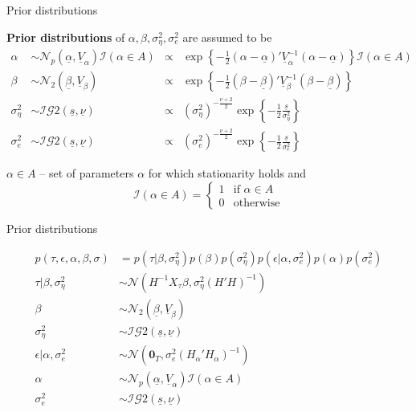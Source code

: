 \documentclass[notes,blackandwhite,mathsans,usenames,dvipsnames]{beamer}
\begin{document}
\begin{frame}{Prior distributions}

\bigskip
\textbf{Prior distributions} of $\alpha, \beta, \sigma^2_\eta, \sigma^2_e$ are assumed to be
\begin{align*}
\alpha&\sim\mathcal{N}_p\left(\underline{\alpha},\underline{V}_{\alpha}\right)\mathcal{I}(\alpha\in A)&\propto& \exp\left\{ -\frac{1}{2}(\alpha-\underline{\alpha})'\underline{V}_\alpha^{-1}(\alpha-\underline{\alpha}) \right\}\mathcal{I}(\alpha\in A) \\[2ex]
\beta&\sim\mathcal{N}_2\left(\underline{\beta},\underline{V}_{\beta}\right)&\propto& \exp\left\{ -\frac{1}{2}(\beta-\underline{\beta})'\underline{V}_\beta^{-1}(\beta-\underline{\beta}) \right\}\\[2ex]
\sigma^2_\eta&\sim\mathcal{IG}2\left(\underline{s},\underline{\nu}\right)&\propto&\left(\sigma^2_\eta\right)^{-\frac{\underline{\nu}+2}{2}} \exp\left\{ -\frac{1}{2}\frac{\underline{s}}{\sigma^2_\eta} \right\}\\[2ex]
\sigma^2_e&\sim\mathcal{IG}2\left(\underline{s},\underline{\nu}\right) &\propto&\left(\sigma^2_e\right)^{-\frac{\underline{\nu}+2}{2}} \exp\left\{ -\frac{1}{2}\frac{\underline{s}}{\sigma^2_e} \right\}
\end{align*}

$\alpha\in A$ {\color{mcxs2} -- set of parameters } $\alpha$ {\color{mcxs2} for which stationarity holds and} 
$$ \mathcal{I}(\alpha\in A)=\left\{ \begin{array}{ll} 1 &\text{if }\alpha\in A \\ 0 &\text{otherwise} \end{array}\right. $$

\end{frame}



\begin{frame}{Prior distributions}

\begin{align*}
p(\tau,\epsilon,\alpha,\beta,\sigma) &= p\left(\tau|\beta,\sigma^2_\eta\right)p(\beta)p\left(\sigma^2_\eta\right)
p\left(\epsilon|\alpha,\sigma^2_e\right)p(\alpha)p\left(\sigma^2_e\right)\\[3ex]
\tau|\beta,\sigma^2_\eta &\sim\mathcal{N}\left(H^{-1} X_\tau \beta, \sigma^2_\eta (H'H)^{-1}\right)\\
\beta&\sim\mathcal{N}_2\left(\underline{\beta},\underline{V}_{\beta}\right)\\
\sigma^2_\eta&\sim\mathcal{IG}2\left(\underline{s},\underline{\nu}\right)\\[1ex]
\epsilon|\alpha,\sigma^2_e &\sim\mathcal{N}\left(\mathbf{0}_T, \sigma^2_e (H_{\alpha}'H_{\alpha})^{-1}\right)\\
\alpha&\sim\mathcal{N}_p\left(\underline{\alpha},\underline{V}_{\alpha}\right)\mathcal{I}(\alpha\in A)\\
\sigma^2_e&\sim\mathcal{IG}2\left(\underline{s},\underline{\nu}\right)
\end{align*}

\end{frame}
\end{document}
